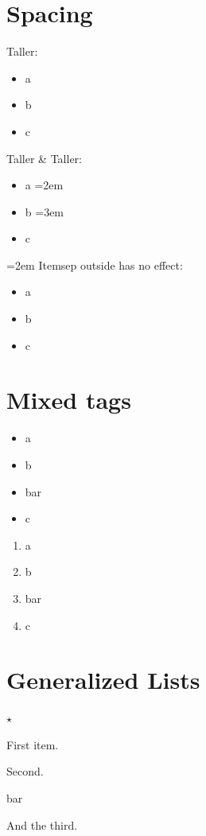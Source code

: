 \documentclass{article}
\begin{document}
\section{Spacing}
Taller:
\begin{itemize}
\itemsep=2em
\item a
\item b
\item c
\end{itemize}

Taller \& Taller:
\begin{itemize}
\item a
\itemsep=2em
\item b
\itemsep=3em
\item c
\end{itemize}

{\itemsep=2em
Itemsep outside has no effect:
\begin{itemize}
\item a
\item b
\item c
\end{itemize}}

\section{Mixed tags}
\begin{itemize}
\item a
\item b
\item[foo] bar
\item c
\end{itemize}

\begin{enumerate}
\item a
\item b
\item[foo] bar
\item c
\end{enumerate}

\section{Generalized Lists}
\begin{list}{$\star$}{}
   \item First item.
   \item Second.
   \item[foo] bar
   \item And the third.
\end{list}


\end{document}
